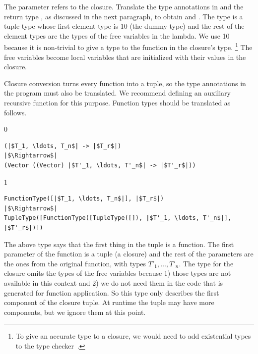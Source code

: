 \documentclass[7x10]{TimesAPriori_MIT}%
\def\racketEd{0}
\def\pythonEd{1}
\def\edition{0}
\newcommand{\racket}[1]{{\if\edition\racketEd{#1}\fi}}
\newcommand{\python}[1]{{\if\edition\pythonEd #1\fi}}
\numberwithin{theorem}{chapter}
\numberwithin{definition}{chapter}
\numberwithin{equation}{chapter}
\begin{document}
The  parameter refers to the closure.  Translate the type
annotations in  and the return type , as discussed in
the next paragraph, to obtain  and .  The type
 is a tuple type whose first element type is
\python{}\racket{\code{\_} (the dummy type)} and the rest of
the element types are the types of the free variables in the
lambda. We use \python{}\racket{\code{\_}} because it
is non-trivial to give a type to the function in the closure's type.%
%
\footnote{To give an accurate type to a closure, we would need to add
  existential types to the type checker~\citep{Minamide:1996ys}.}
%
The free variables become local variables that are initialized with
their values in the closure.

Closure conversion turns every function into a tuple, so the type
annotations in the program must also be translated.  We recommend
defining an auxiliary recursive function for this purpose.  Function
types should be translated as follows.
%
{\if\edition\racketEd
\begin{lstlisting}
(|$T_1, \ldots, T_n$| -> |$T_r$|)
|$\Rightarrow$|  
(Vector ((Vector) |$T'_1, \ldots, T'_n$| -> |$T'_r$|))
\end{lstlisting}
\fi}
{\if\edition\pythonEd
\begin{lstlisting}
FunctionType([|$T_1, \ldots, T_n$|], |$T_r$|)
|$\Rightarrow$|  
TupleType([FunctionType([TupleType([]), |$T'_1, \ldots, T'_n$|], |$T'_r$|)])
\end{lstlisting}
\fi}
%
The above type says that the first thing in the tuple is a
function. The first parameter of the function is a tuple (a closure)
and the rest of the parameters are the ones from the original
function, with types $T'_1, \ldots, T'_n$.  The type for the closure
omits the types of the free variables because 1) those types are not
available in this context and 2) we do not need them in the code that
is generated for function application. So this type only describes the
first component of the closure tuple. At runtime the tuple may have
more components, but we ignore them at this point.
\end{document}
